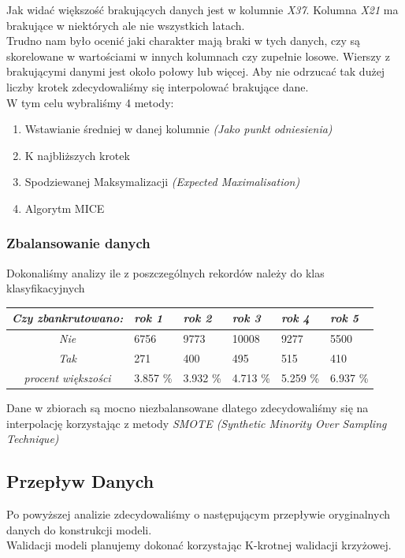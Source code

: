 \documentclass[11pt]{article}
\begin{document}
Jak widać większość brakujących danych jest w kolumnie \textit{X37}. Kolumna \textit{X21} ma brakujące w niektórych ale nie wszystkich latach.\\
Trudno nam było ocenić jaki charakter mają braki w tych danych, czy są skorelowane w wartościami w innych kolumnach czy zupełnie losowe. Wierszy z brakującymi danymi jest około połowy lub więcej. Aby nie odrzucać tak dużej liczby krotek zdecydowaliśmy się interpolować brakujące dane.\\
W tym celu wybraliśmy 4 metody:
\begin{enumerate}
	\item Wstawianie średniej w danej kolumnie \textit{(Jako punkt odniesienia)}
	\item K najbliższych krotek
	\item Spodziewanej Maksymalizacji \textit{(Expected Maximalisation)}
	\item Algorytm MICE
\end{enumerate}
\subsubsection{Zbalansowanie danych}
Dokonaliśmy analizy ile z poszczególnych rekordów należy do klas klasyfikacyjnych
\begin{center}
	\begin{tabular}{|c|m{0.7in}|m{0.7in}|m{0.7in}|m{0.7in}|m{0.7in}|}
		\hline
		\textit{Czy zbankrutowano:}& \textit{rok 1} & \textit{rok 2} & \textit{rok 3} & \textit{rok 4} & \textit{rok 5} \\ \hline
		\textit{Nie} & 6756 & 9773 & 10008 & 9277 & 5500 \\ \hline
		\textit{Tak} & 271 & 400 & 495 & 515 & 410 \\ \hline \hline
		\textit{procent większości} & 3.857 \% & 3.932 \% & 4.713 \% & 5.259 \% & 6.937 \% \\ \hline
	\end{tabular}
\end{center}
Dane w zbiorach są mocno niezbalansowane dlatego zdecydowaliśmy się na interpolację korzystając z metody \textit{SMOTE (Synthetic Minority Over Sampling Technique)}
\subsection{Przepływ Danych}
Po powyższej analizie zdecydowaliśmy o następującym przepływie oryginalnych danych do konstrukcji modeli.\\
Walidacji modeli planujemy dokonać korzystając K-krotnej walidacji krzyżowej.
\end{document}
